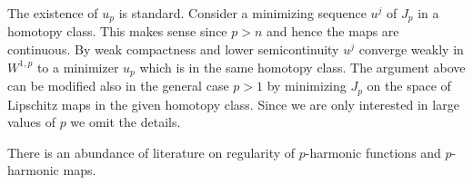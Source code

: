 \documentclass{ip-journal}
\newtheorem{proposition}[theorem]{Proposition}
\theoremstyle{definition}
\numberwithin{equation}{section}
\begin{document}
The existence of $u_p$ is  standard.  Consider a minimizing sequence $u^j$ of $J_p$ in a homotopy class. This makes sense since $p>n$ and hence the maps are continuous. By weak compactness and lower semicontinuity  $u^j$  converge weakly in $W^{1,p}$ to a minimizer
$u_p$ which is in the same homotopy class. 
The argument above can be modified also in the general case $ p>1  $ by minimizing $J_p$  on the space of Lipschitz maps in the given homotopy class.  Since we are only interested in large values of $p$ we  omit the details.




There is an abundance of literature on regularity of $p$-harmonic functions and $p$-harmonic maps.
 
\end{document}

